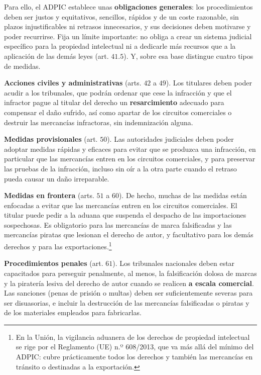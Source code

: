\documentclass[10pt,a4paper]{article}
\begin{document}
Para ello, el ADPIC establece unas \textbf{obligaciones generales}: los procedimientos deben ser justos y equitativos, sencillos, rápidos y de un coste razonable, sin plazos injustificables ni retrasos innecesarios, y sus decisiones deben motivarse y poder recurrirse. Fija un límite importante: no obliga a crear un sistema judicial específico para la propiedad intelectual ni a dedicarle más recursos que a la aplicación de las demás leyes (art. $41.5$). Y, sobre esa base distingue cuatro tipos de medidas.

\textbf{Acciones civiles y administrativas} (arts. $42$ a $49$). Los titulares deben poder acudir a los tribunales, que podrán ordenar que cese la infracción y que el infractor pague al titular del derecho un \textbf{resarcimiento} adecuado para compensar el daño sufrido, así como apartar de los circuitos comerciales o destruir las mercancías infractoras, sin indemnización alguna.

\textbf{Medidas provisionales} (art. $50$). Las autoridades judiciales deben poder adoptar medidas rápidas y eficaces para evitar que se produzca una infracción, en particular que las mercancías entren en los circuitos comerciales, y para preservar las pruebas de la infracción, incluso sin oír a la otra parte cuando el retraso pueda causar un daño irreparable.

\textbf{Medidas en frontera} (arts. $51$ a $60$). De hecho, muchas de las medidas están enfocadas a evitar que las mercancías entren en los circuitos comerciales. El titular puede pedir a la aduana que suspenda el despacho de las importaciones sospechosas. Es obligatorio para las mercancías de marca falsificadas y las mercancías piratas que lesionan el derecho de autor, y facultativo para los demás derechos y para las exportaciones.\footnote{%
  En la Unión, la vigilancia aduanera de los derechos de propiedad intelectual se rige por el Reglamento (UE) n.º 608/2013, que va más allá del mínimo del ADPIC: cubre prácticamente todos los derechos y también las mercancías en tránsito o destinadas a la exportación.
}

\textbf{Procedimientos penales} (art. $61$). Los tribunales nacionales deben estar capacitados para perseguir penalmente, al menos, la falsificación dolosa de marcas y la piratería lesiva del derecho de autor cuando se realicen \textbf{a escala comercial}. Las sanciones (penas de prisión o multas) deben ser suficientemente severas para ser disuasorias, e incluir la destrucción de las mercancías falsificadas o piratas y de los materiales empleados para fabricarlas.
\end{document}
